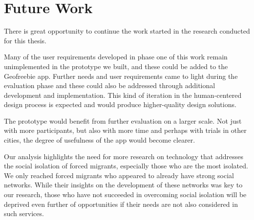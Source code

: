 \section{Future Work}
\label{sec:future_work}

There is great opportunity to continue the work started in the research conducted for this thesis.

Many of the user requirements developed in phase one of this work remain unimplemented in the prototype we built, and these could be added to the Geofreebie app. Further needs and user requirements came to light during the evaluation phase and these could also be addressed through additional development and implementation. This kind of iteration in the human-centered design process is expected and would produce higher-quality design solutions.

The prototype would benefit from further evaluation on a larger scale. Not just with more participants, but also with more time and perhaps with trials in other cities, the degree of usefulness of the app would become clearer.

Our analysis highlights the need for more research on technology that addresses the social isolation of forced migrants, especially those who are the most isolated. We only reached forced migrants who appeared to already have strong social networks. While their insights on the development of these networks was key to our research, those who have not succeeded in overcoming social isolation will be deprived even further of opportunities if their needs are not also considered in such services.
